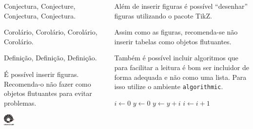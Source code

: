 \documentclass[]{beamer}
\begin{document}
\begin{frame}[t,fragile]
\begin{columns}[t]
\begin{column}{0.4\textwidth}
      \begin{con}
        Conjectura, Conjecture, Conjectura, Conjectura.
      \end{con}

      \begin{cor}
        Corolário, Corolário, Corolário, Corolário.
      \end{cor}

      \begin{dfn}
        Definição, Definição, Definição.
      \end{dfn}

      É possível inserir figuras. Recomenda-o não fazer como objetos flutuantes
      para evitar problemas.
      \begin{center}
        \includegraphics[width=0.1\textwidth]{figuras/unicamp-logo}
      \end{center}
    \end{column}
    \begin{column}{0.4\textwidth}
      Além de inserir figuras é possível ``desenhar'' figuras
      utilizando o pacote TikZ.
      \begin{center}
      \end{center}

      Assim como as figuras, recomenda-se não inserir tabelas como objetos
      flutuantes.

      Também é possível incluir algoritmos que para facilitar a leitura é bom
      ser incluidor de forma adequada e não como uma lista. Para isso utilize o
      ambiente \lstinline+algorithmic+.
      \begin{algorithmic}[2]
        \STATE $i \leftarrow 0$
        \STATE $y \leftarrow 0$
        \STATE $y \leftarrow y + i$
        \STATE $i \leftarrow i + 1$
        \ENDFOR
      \end{algorithmic}


\end{column}
\end{columns}
\end{frame}
\end{document}
